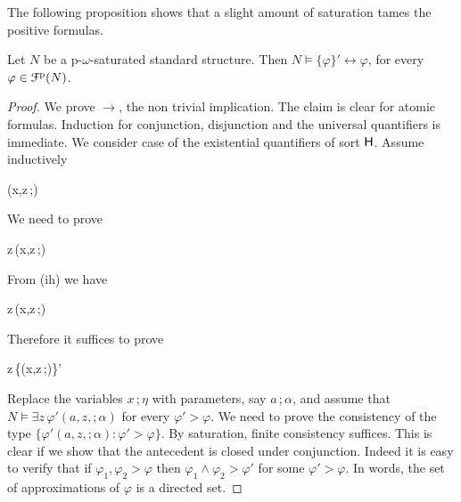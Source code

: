 \documentclass{amsproc}
\begin{document}
The following proposition shows that a slight amount of saturation tames the positive formulas.

\begin{proposition}\label{prop_approx}
  Let $N$ be a p-$\omega$-saturated standard structure.
  Then $N\models\{\varphi\}'\leftrightarrow\varphi$, for every $\varphi\in{\EuScript F}^{\rm p}(N)$.
\end{proposition}

\begin{proof}
  We prove $\rightarrow$, the non trivial implication.
  The claim is clear for atomic formulas.
  Induction for conjunction, disjunction and the universal quantifiers is immediate.
%
%
%
%
%
  We consider case of the existential quantifiers of sort ${\sf H}$.
  Assume inductively
  
  {\rightarrow}
  {\varphi(x,z\,;\eta)}

  We need to prove

  {\rightarrow}
  {\exists z\,\varphi(x,z\,;\eta)}

  From (ih) we have

  {\rightarrow}
  {\exists z\,\varphi(x,z\,;\eta)}

  Therefore it suffices to prove

  {\rightarrow}
  {\exists z\,\{\varphi(x,z\,;\eta)\}'}

Replace the variables $x\,;\eta$ with parameters, say $a\,;\alpha$, and assume that $N\models\exists z\,\varphi'(a,z,;\alpha)$ for every $\varphi'>\varphi$.
We need to prove the consistency of the type $\{\varphi'(a,z,;\alpha):\varphi'>\varphi\}$.
By saturation, finite consistency suffices.
This is clear if we show that the antecedent is closed under conjunction.
Indeed it is easy to verify that if $\varphi_1,\varphi_2>\varphi$ then $\varphi_1\wedge\varphi_2>\varphi'$ for some $\varphi'>\varphi$.
In words, the set of approximations of $\varphi$ is a directed set.


\end{proof}
\end{document}
